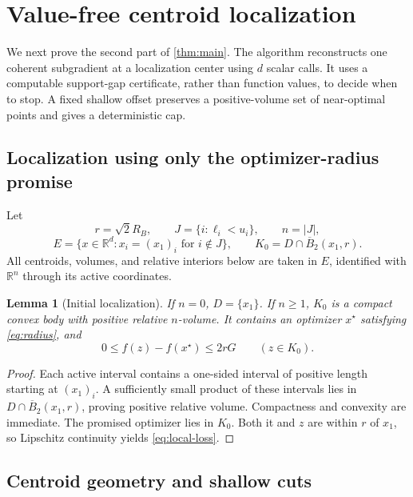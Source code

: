 \documentclass[11pt]{article}
\numberwithin{equation}{section}
\newtheorem{lemma}[lemma]{Lemma}
\theoremstyle{definition}
\theoremstyle{remark}
\newcommand{\R}{\mathbb R}
\begin{document}
\section{Value-free centroid localization}\label{sec:cutting-plane}

We next prove the second part of \cref{thm:main}. The algorithm reconstructs one coherent subgradient at a localization center using $d$ scalar calls. It uses a computable support-gap certificate, rather than function values, to decide when to stop. A fixed shallow offset preserves a positive-volume set of near-optimal points and gives a deterministic cap.

\subsection{Localization using only the optimizer-radius promise}

Let
\begin{equation}\label{eq:localization}
r=\sqrt2R_B,\qquad
J=\{i:\ell_i<u_i\},\qquad n=|J|,
\end{equation}
\[
E=\{x\in\R^d:x_i=(x_1)_i\text{ for }i\notin J\},
\qquad K_0=D\cap\overline B_2(x_1,r).
\]
All centroids, volumes, and relative interiors below are taken in $E$, identified with $\R^n$ through its active coordinates.

\begin{lemma}[Initial localization]\label{lem:initial}
If $n=0$, $D=\{x_1\}$. If $n\ge1$, $K_0$ is a compact convex body with positive relative $n$-volume. It contains an optimizer $x^\star$ satisfying \eqref{eq:radius}, and
\begin{equation}\label{eq:local-loss}
0\le f(z)-f(x^\star)\le2rG\qquad(z\in K_0).
\end{equation}
\end{lemma}
\begin{proof}
Each active interval contains a one-sided interval of positive length starting at $(x_1)_i$. A sufficiently small product of these intervals lies in $D\cap\overline B_2(x_1,r)$, proving positive relative volume. Compactness and convexity are immediate. The promised optimizer lies in $K_0$. Both it and $z$ are within $r$ of $x_1$, so Lipschitz continuity yields \eqref{eq:local-loss}.
\end{proof}

\subsection{Centroid geometry and shallow cuts}
\end{document}
